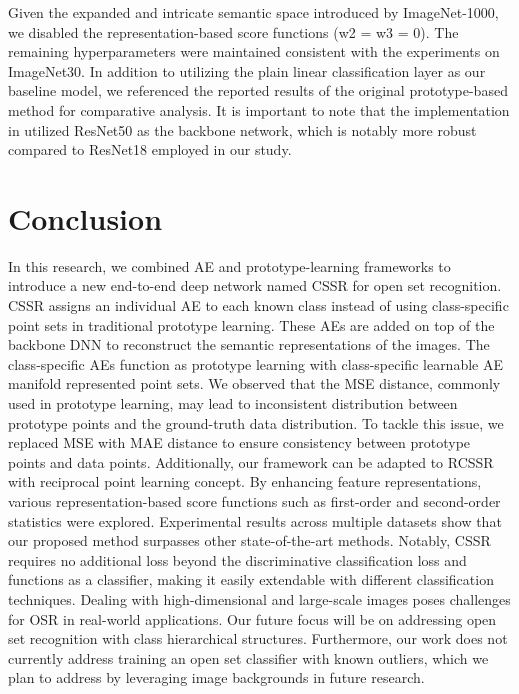 \documentclass{gji}
\begin{document}
Given the expanded and intricate semantic space introduced by ImageNet-1000, we disabled the representation-based score functions (w2 = w3 = 0). The remaining hyperparameters were maintained consistent with the experiments on ImageNet30. In addition to utilizing the plain linear classification layer as our baseline model, we referenced the reported results of the original prototype-based method \cite{10} for comparative analysis. It is important to note that the implementation in utilized ResNet50 as the backbone network, which is notably more robust compared to ResNet18 employed in our study.

\section{Conclusion}
In this research, we combined AE and prototype-learning frameworks to introduce a new end-to-end deep network named CSSR for open set recognition. CSSR assigns an individual AE to each known class instead of using class-specific point sets in traditional prototype learning. These AEs are added on top of the backbone DNN to reconstruct the semantic representations of the images. The class-specific AEs function as prototype learning with class-specific learnable AE manifold represented point sets. We observed that the MSE distance, commonly used in prototype learning, may lead to inconsistent distribution between prototype points and the ground-truth data distribution. To tackle this issue, we replaced MSE with MAE distance to ensure consistency between prototype points and data points. Additionally, our framework can be adapted to RCSSR with reciprocal point learning concept. By enhancing feature representations, various representation-based score functions such as first-order and second-order statistics were explored. Experimental results across multiple datasets show that our proposed method surpasses other state-of-the-art methods. Notably, CSSR requires no additional loss beyond the discriminative classification loss and functions as a classifier, making it easily extendable with different classification techniques. Dealing with high-dimensional and large-scale images poses challenges for OSR in real-world applications. Our future focus will be on addressing open set recognition with class hierarchical structures. Furthermore, our work does not currently address training an open set classifier with known outliers, which we plan to address by leveraging image backgrounds in future research.

\end{document}
